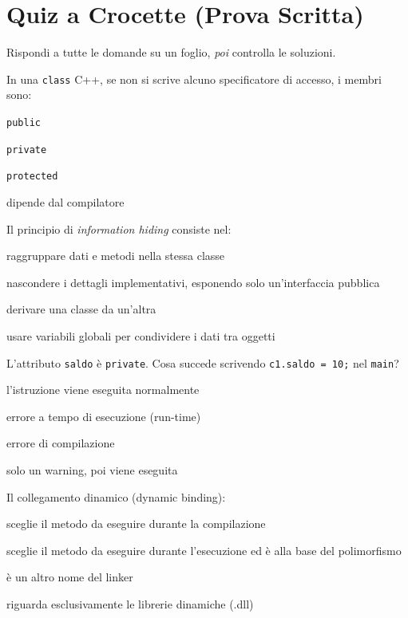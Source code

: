 \section{Quiz a Crocette (Prova Scritta)}

Rispondi a tutte le domande su un foglio, \emph{poi} controlla le soluzioni.

\begin{quiz}{In una \texttt{class} C++, se non si scrive alcuno specificatore di accesso, i membri sono:}
  \item \texttt{public}
  \item \texttt{private}
  \item \texttt{protected}
  \item dipende dal compilatore
\end{quiz}

\begin{quiz}{Il principio di \emph{information hiding} consiste nel:}
  \item raggruppare dati e metodi nella stessa classe
  \item nascondere i dettagli implementativi, esponendo solo un'interfaccia pubblica
  \item derivare una classe da un'altra
  \item usare variabili globali per condividere i dati tra oggetti
\end{quiz}

\begin{quiz}{L'attributo \texttt{saldo} è \texttt{private}. Cosa succede scrivendo \texttt{c1.saldo = 10;} nel \texttt{main}?}
  \item l'istruzione viene eseguita normalmente
  \item errore a tempo di esecuzione (run-time)
  \item errore di compilazione
  \item solo un warning, poi viene eseguita
\end{quiz}

\begin{quiz}{Il collegamento dinamico (dynamic binding):}
  \item sceglie il metodo da eseguire durante la compilazione
  \item sceglie il metodo da eseguire durante l'esecuzione ed è alla base del polimorfismo
  \item è un altro nome del linker
  \item riguarda esclusivamente le librerie dinamiche (.dll)
\end{quiz}

